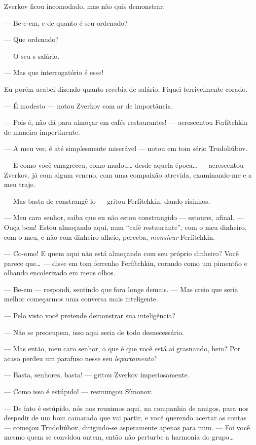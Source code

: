 Zverkov ficou incomodado, mas não quis demonstrar.

--- Be-e-em, e de quanto é seu ordenado?

--- Que ordenado?

--- O seu s-salário.

--- Mas que interrogatório é esse!

Eu porém acabei dizendo quanto recebia de salário. Fiquei terrivelmente
corado.

--- É modesto --- notou Zverkov com ar de importância.

--- Pois é, não dá para almoçar em cafés restaurantes! --- acrescentou
Ferfítchkin de maneira impertinente.

--- A meu ver, é até simplesmente miserável --- notou em tom sério
Trudoliúbov.

--- E como você emagreceu, como mudou\ldots{} desde aquela época\ldots{} ---
acrescentou Zverkov, já com algum veneno, com uma compaixão atrevida,
examinando-me e a meu traje.

--- Mas basta de constrangê-lo --- gritou Ferfítchkin, dando risinhos.

--- Meu caro senhor, saiba que eu não estou constrangido --- estourei,
afinal. --- Ouça bem! Estou almoçando aqui, num “café restaurante”, com o
meu dinheiro, com o meu, e não com dinheiro alheio, perceba,
\textit{monsieur} Ferfítchkin.

--- Co-omo! E quem aqui não está almoçando com seu próprio dinheiro? Você
parece que\ldots{} --- disse em tom ferrenho Ferfítchkin, corando como um
pimentão e olhando encolerizado em meus olhos.

--- Be-em --- respondi, sentindo que fora longe demais. --- Mas creio que
seria melhor começarmos uma conversa mais inteligente.

--- Pelo visto você pretende demonstrar sua inteligência?

--- Não se preocupem, isso aqui seria de todo desnecessário.

--- Mas então, meu caro senhor, o que é que você está aí grasnando, hein?
Por acaso perdeu um parafuso nesse seu \textit{lepartamento}?

--- Basta, senhores, basta! --- gritou Zverkov imperiosamente.

--- Como isso é estúpido! --- resmungou Símonov.

--- De fato é estúpido, nós nos reunimos aqui, na companhia de amigos,
para nos despedir de um bom camarada que vai partir, e você querendo
acertar as contas --- começou Trudoliúbov, dirigindo-se asperamente
apenas para mim. --- Foi você mesmo quem se convidou ontem, então não
perturbe a harmonia do grupo\ldots{}

